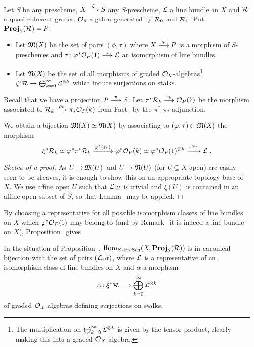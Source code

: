 \documentclass[a4paper,parskip=half,numbers=enddot, DIV=12]{scrreprt}
\begin{document}
Let $S$ be any prescheme, $X\morphism[\xi]S$ any $S$-prescheme, $\mathcal{L}$ a line bundle on $X$ and $\mathcal{R}$ a quasi-coherent graded $\mathcal{O}_S$-algebra generated by $\mathcal{R}_0$ and $\mathcal{R}_1$. Put $\operatorname{\mathbf{Proj}}_S(\mathcal{R})=P$.
\begin{itemize}
	\item Let $\mathfrak{M}(X)$ be the set of pairs $(\phi,\tau)$ where $X\morphism[\phi]P$ is a morphism of $S$-preschemes and $\tau\colon \phi^*\Oo_{P}(1)\isomorphism \Ll$ an isomorphism of line bundles.	
	\item Let $\mathfrak{N}(X)$ be the set of all morphisms of graded $\mathcal{O}_X$-algebras\footnote{The multiplication on $\bigoplus_{k=0}^\infty\mathcal{L}^{\otimes k}$ is given by the tensor product, clearly making this into a graded $\mathcal{O}_X$-algebra.} $\xi^*\Rr\morphism\bigoplus_{k=0}^\infty\Ll^{\otimes k}$ which induce surjections on stalks.
\end{itemize}
Recall that we have a projection $P\morphism[\pi]S$. Let $\pi^*\Rr_k\morphism[\epsilon_k]\Oo_{P}(k)$ be the morphism associated to $\Rr_k\morphism[\rho_k]\pi_*\Oo_{P}(k)$ from Fact~ by the $\pi^*$-$\pi_*$ adjunction. 
\begin{prop}	
	We obtain a bijection $\mathfrak{M}(X)\simeq \mathfrak{N}(X)$ by associating to $(\varphi,\tau)\in\mathfrak{M}(X)$ the morphism 
	\begin{align*}
		\xi^*\mathcal{R}_k\simeq \varphi^*\pi^*\mathcal{R}_k\xrightarrow{\varphi^*(\varepsilon_k)}\varphi^*\mathcal{O}_{P}(k)\simeq \varphi^*\mathcal{O}_{P}(1)^{\otimes k}\xrightarrow{\tau^{\otimes k}}\mathcal{L}\;.
	\end{align*}
\end{prop}
\begin{proof}[Sketch of a proof]
	As $U\mapsto\mathfrak{M}(U)$ and $U\mapsto\mathfrak{N}(U)$ (for $U\subseteq X$ open) are easily seen to be sheaves, it is enough to show this on an appropriate topology base of $X$. We use affine open $U$ such that $\mathcal{L}|_U$ is trivial and $\xi(U)$ is contained in an affine open subset of $S$, so that Lemma~ may be applied.
\end{proof}
By choosing a representative for all possible isomorphism classes of line bundles on $X$ which $\varphi^*\mathcal{O}_P(1)$ may belong to (and by Remark~ it is indeed a line bundle on $X$), Proposition~ gives
\begin{cor}
	In the situation of Proposition~, $\operatorname{Hom}_{S\operatorname{-PreSch}}(X,\operatorname{\mathbf{Proj}}_S(\mathcal{R}))$ is in canonical bijection with the set of pairs $(\mathcal{L},\alpha)$, where $\mathcal{L}$ is a representative of an isomorphism class of line bundles on $X$ and $\alpha$ a morphism
	\begin{align}\lbl{eq:WhatIsAlpha}
		\alpha\colon\xi^*\Rr\morphism\bigoplus_{k=0}^\infty\Ll^{\otimes k}
	\end{align}
	of graded $\mathcal{O}_X$-algebras defining surjections on stalks.
\end{cor}
\end{document}
